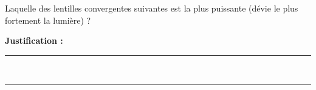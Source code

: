 Laquelle des lentilles convergentes suivantes est la plus puissante (dévie le plus fortement la lumière) ?

\choices

\noindent\textbf{Justification :} \hrulefill \\[2.5ex]
\rule{\linewidth}{0.4pt} \\[2.5ex]
\rule{\linewidth}{0.4pt}
\vfill
